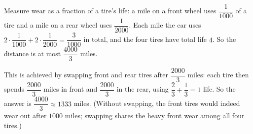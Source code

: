Measure wear as a fraction of a tire's life: a mile on a front wheel uses $\dfrac{1}{1000}$ of a tire and a mile on a rear wheel uses $\dfrac{1}{2000}$. Each mile the car uses $2\cdot\dfrac{1}{1000}+2\cdot\dfrac{1}{2000}=\dfrac{3}{1000}$ in total, and the four tires have total life $4$. So the distance is at most $\dfrac{4000}{3}$ miles.

This is achieved by swapping front and rear tires after $\dfrac{2000}{3}$ miles: each tire then spends $\dfrac{2000}{3}$ miles in front and $\dfrac{2000}{3}$ in the rear, using $\dfrac{2}{3}+\dfrac{1}{3}=1$ life. So the answer is $\boxed{\dfrac{4000}{3}\approx1333}$ miles. (Without swapping, the front tires would indeed wear out after $1000$ miles; swapping shares the heavy front wear among all four tires.)
